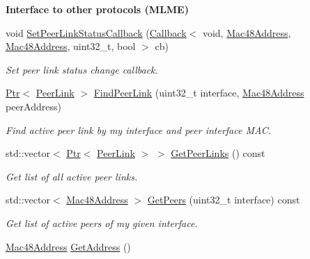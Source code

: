 \begin{Indent}{\bf Interface to other protocols (M\+L\+ME)}\par
\begin{DoxyCompactItemize}
\item 
void \hyperlink{classns3_1_1dot11s_1_1PeerManagementProtocol_a7e5317759305cc7a42e033daa4e4a1a0}{Set\+Peer\+Link\+Status\+Callback} (\hyperlink{classns3_1_1Callback}{Callback}$<$ void, \hyperlink{classns3_1_1Mac48Address}{Mac48\+Address}, \hyperlink{classns3_1_1Mac48Address}{Mac48\+Address}, uint32\+\_\+t, bool $>$ cb)
\begin{DoxyCompactList}\small\item\em Set peer link status change callback. \end{DoxyCompactList}\item 
\hyperlink{classns3_1_1Ptr}{Ptr}$<$ \hyperlink{classns3_1_1dot11s_1_1PeerLink}{Peer\+Link} $>$ \hyperlink{classns3_1_1dot11s_1_1PeerManagementProtocol_adc13cd9c290c7098d598af016b606133}{Find\+Peer\+Link} (uint32\+\_\+t interface, \hyperlink{classns3_1_1Mac48Address}{Mac48\+Address} peer\+Address)
\begin{DoxyCompactList}\small\item\em Find active peer link by my interface and peer interface M\+AC. \end{DoxyCompactList}\item 
std\+::vector$<$ \hyperlink{classns3_1_1Ptr}{Ptr}$<$ \hyperlink{classns3_1_1dot11s_1_1PeerLink}{Peer\+Link} $>$ $>$ \hyperlink{classns3_1_1dot11s_1_1PeerManagementProtocol_a7a9c6cd647f59238efdfd8f7cf38d534}{Get\+Peer\+Links} () const 
\begin{DoxyCompactList}\small\item\em Get list of all active peer links. \end{DoxyCompactList}\item 
std\+::vector$<$ \hyperlink{classns3_1_1Mac48Address}{Mac48\+Address} $>$ \hyperlink{classns3_1_1dot11s_1_1PeerManagementProtocol_a65e346f4553909eb3f0bf7f44d4befb8}{Get\+Peers} (uint32\+\_\+t interface) const 
\begin{DoxyCompactList}\small\item\em Get list of active peers of my given interface. \end{DoxyCompactList}\item 
\hyperlink{classns3_1_1Mac48Address}{Mac48\+Address} \hyperlink{classns3_1_1dot11s_1_1PeerManagementProtocol_ad3f24d945eaeec61d5a76598bf655484}{Get\+Address} ()
\item 

\end{DoxyCompactItemize}
\end{Indent}
